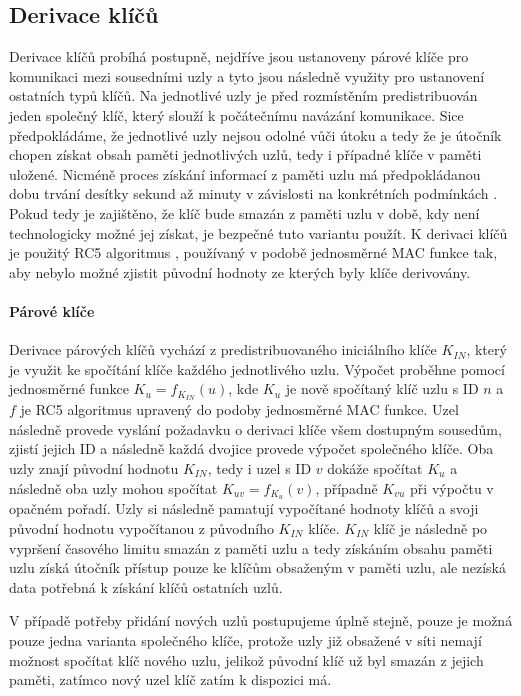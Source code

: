 \documentclass[11pt,final,twoside]{fithesis2}
\begin{document}
\subsection{Derivace klíčů}

Derivace klíčů probíhá postupně, nejdříve jsou ustanoveny párové klíče pro komunikaci mezi sousedními uzly a tyto jsou následně využity pro ustanovení ostatních typů klíčů. 
Na jednotlivé uzly je před rozmístěním predistribuován jeden společný klíč, který slouží k počátečnímu navázání komunikace. Sice předpokládáme, že jednotlivé uzly nejsou odolné vůči 
útoku a tedy že je útočník chopen získat obsah paměti jednotlivých uzlů, tedy i případné klíče v paměti uložené. Nicméně proces získání informací z paměti uzlu má předpokládanou dobu trvání desítky sekund 
až minuty v závislosti na konkrétních podmínkách \cite{Deng2005}. Pokud tedy je zajištěno, že klíč bude smazán z paměti uzlu v době, kdy není technologicky možné jej získat, je bezpečné tuto variantu použít.
K derivaci klíčů je použitý RC5 algoritmus \cite{Rivest1995}, používaný v podobě jednosměrné MAC funkce tak, aby nebylo možné zjistit původní hodnoty ze kterých byly klíče derivovány.

\paragraph{Párové klíče} 
Derivace párových klíčů vychází z predistribuovaného iniciálního klíče $K_{IN}$, který je využit ke spočítání klíče každého jednotlivého uzlu. Výpočet proběhne pomocí jednosměrné funkce 
$K_u=f_{K_{IN}}(u)$, kde $K_u$ je nově spočítaný klíč uzlu s ID $n$ a $f$ je RC5 algoritmus upravený do podoby jednosměrné MAC funkce. Uzel následně provede vyslání požadavku o derivaci klíče všem dostupným 
sousedům, zjistí jejich ID a následně každá dvojice provede výpočet společného klíče. Oba uzly znají původní hodnotu $K_{IN}$, tedy i uzel s ID $v$ dokáže spočítat $K_u$ a následně oba uzly mohou spočítat
$K_{uv} = f_{K_{u}}(v)$, případně $K_{vu}$ při výpočtu v opačném pořadí. Uzly si následně pamatují vypočítané hodnoty klíčů a svoji původní hodnotu vypočítanou z původního $K_{IN}$ klíče. 
$K_{IN}$ klíč je následně po vypršení časového limitu smazán z paměti uzlu a tedy získáním obsahu paměti uzlu získá útočník přístup pouze ke klíčům obsaženým v paměti uzlu, ale nezíská data potřebná k 
získání klíčů ostatních uzlů.

V případě potřeby přidání nových uzlů postupujeme úplně stejně, pouze je možná pouze jedna varianta společného klíče, protože uzly již obsažené v síti nemají možnost spočítat klíč nového uzlu, jelikož 
původní klíč už byl smazán z jejich paměti, zatímco nový uzel klíč zatím k dispozici má. 
\end{document}
